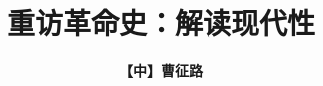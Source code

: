 \documentclass[a4paper, 12pt, openright]{ctexbook}
\begin{document}
\frontmatter

\title{\Huge \textbf{重访革命史：解读现代性}}
\author{\textbf{【中】曹征路}}
\date{}

\maketitle

\tableofcontents

\mainmatter



\end{document}
